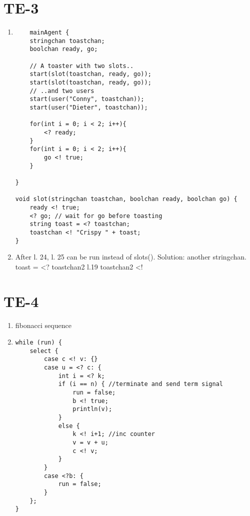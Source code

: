 \documentclass[12pt]{article}
\begin{document}
    \section{TE-3}
    \begin{enumerate}[label=(\alph*)]
        \item 
    \begin{lstlisting}
    mainAgent {
    stringchan toastchan;
    boolchan ready, go;

    // A toaster with two slots..
    start(slot(toastchan, ready, go));
    start(slot(toastchan, ready, go));
    // ..and two users
    start(user("Conny", toastchan));
    start(user("Dieter", toastchan));
    
    for(int i = 0; i < 2; i++){
        <? ready;
    }
    for(int i = 0; i < 2; i++){
        go <! true;
    }

}

void slot(stringchan toastchan, boolchan ready, boolchan go) {
    ready <! true;
    <? go; // wait for go before toasting
    string toast = <? toastchan;
    toastchan <! "Crispy " + toast;
}
    \end{lstlisting}
    \item After l. 24, l. 25 can be run instead of slots(). Solution: another stringchan. toast = <? toastchan2 l.19 toastchan2 <! 
    \end{enumerate}
    \newpage
    \section{TE-4}
    \begin{enumerate}
        \item fibonacci sequence
        \item \begin{lstlisting}
while (run) {
    select {
        case c <! v: {}
        case u = <? c: {
            int i = <? k;
            if (i == n) { //terminate and send term signal
                run = false;
                b <! true;
                println(v);
            }
            else {
                k <! i+1; //inc counter
                v = v + u;
                c <! v;    
            }  
        }
        case <?b: {
            run = false;
        }
    };
}
        \end{lstlisting}
    \end{enumerate}
\end{document}
